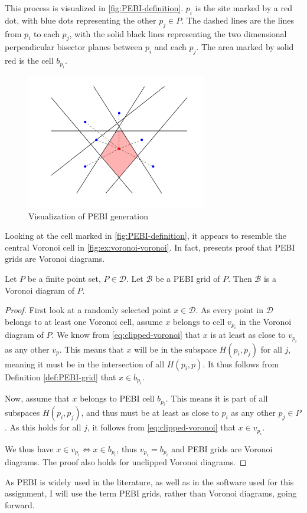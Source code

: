 This process is visualized in \autoref{fig:PEBI-definition}. $p_i$ is the site marked by a red dot, with blue dots representing the other $p_j \in P$. The dashed lines are the lines from $p_i$ to each $p_j$, with the solid black lines representing the two dimensional perpendicular bisector planes between $p_i$ and each $p_j$. The area marked by solid red is the cell $b_{p_i}$.

\begin{figure}[ht]
    \centering
    \includegraphics[width=0.7\textwidth]{report/Images/Theory/PEBI_definition.png}
    \caption{Visualization of PEBI generation}
    \label{fig:PEBI-definition}
\end{figure}

Looking at the cell marked in \autoref{fig:PEBI-definition}, it appears to resemble the central Voronoi cell in \autoref{fig:ex:voronoi-voronoi}. In fact, \textcite{UPR_chapter} presents proof that PEBI grids are Voronoi diagrams.

\begin{theorem}
\label{theorem:PEBI-voronoi}
Let $P$ be a finite point set, $P \in \mathcal{D}$. Let $\mathcal{B}$ be a PEBI grid of $P$. Then $\mathcal{B}$ is a Voronoi diagram of $P$.
\end{theorem}
\begin{proof}
First look at a randomly selected point $x \in \mathcal{D}$. As every point in $\mathcal{D}$ belongs to at least one Voronoi cell, assume $x$ belongs to cell $v_{p_i}$ in the Voronoi diagram of $P$. We know from  \autoref{eq:clipped-voronoi} that $x$ is at least as close to $v_{p_i}$ as any other $v_p$. This means that $x$ will be in the subspace $H(p_i, p_j)$ for all $j$, meaning it must be in the intersection of all $H(p_i, p)$. It thus follows from Definition \ref{def:PEBI-grid} that $x \in b_{p_i}$.

Now, assume that $x$ belongs to PEBI cell $b_{p_i}$. This means it is part of all subspaces $H(p_i, p_j)$, and thus must be at least as close to $p_i$ as any other $p_j \in P$. As this holds for all $j$, it follows from \autoref{eq:clipped-voronoi} that $x \in v_{p_i}$.

We thus have $x \in v_{p_i} \iff x \in b_{p_i}$, thus $v_{p_i} = b_{p_i}$ and PEBI grids are Voronoi diagrams. The proof also holds for unclipped Voronoi diagrams.
\end{proof}

As PEBI is widely used in the literature, as well as in the software used for this assignment, I will use the term PEBI grids, rather than Voronoi diagrams, going forward.

